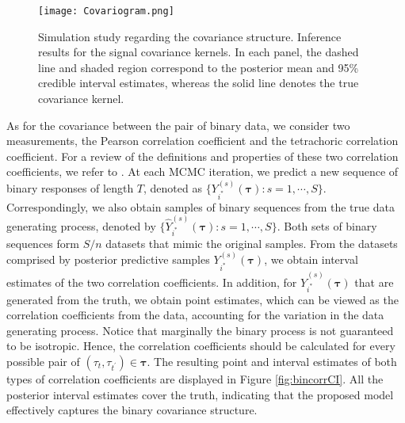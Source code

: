 \begin{figure}[t!]
\centering
\texttt{[image: Covariogram.png]}
\caption{Simulation study regarding the covariance structure. Inference results for the signal covariance kernels. In each panel, the dashed line and shaded region correspond to the posterior mean and 95\% credible interval estimates, whereas the solid line denotes the true covariance kernel.}
\label{fig:covariogram}
\end{figure}

As for the covariance between the pair of binary data, we consider two measurements, the Pearson correlation coefficient and the tetrachoric correlation coefficient. For a review of the definitions and properties of these two correlation coefficients, we refer to \citet{Joakim2011}. At each MCMC iteration, we predict a new sequence of binary responses of length $T$, denoted as $\{Y^{(s)}_{i^*}(\boldsymbol{\tau}):s=1,\cdots,S\}$. Correspondingly, we also obtain samples of binary sequences from the true data generating process, denoted by $\{\hat{Y}^{(s)}_{i^*}(\boldsymbol{\tau}):s=1,\cdots,S\}$. Both sets of binary sequences form $S/n$ datasets that mimic  the original samples. From the datasets comprised by posterior predictive samples $Y^{(s)}_{i^*}(\boldsymbol{\tau})$, we obtain interval estimates of the two correlation coefficients. In addition, for $\hat{Y}^{(s)}_{i^*}(\boldsymbol{\tau})$ that are generated from the truth, we obtain point estimates, which can be viewed as the correlation coefficients from the data, accounting for the variation in the data generating process. Notice that marginally the binary process is not guaranteed to be isotropic. Hence, the correlation coefficients should be calculated for every possible pair of $(\tau_t,\tau_{t^{\prime}})\in\boldsymbol{\tau}$. The resulting point and interval estimates of both types of correlation coefficients are displayed in Figure \ref{fig:bincorrCI}. All the posterior interval estimates cover the truth, indicating that the proposed model effectively captures the binary covariance structure.  

